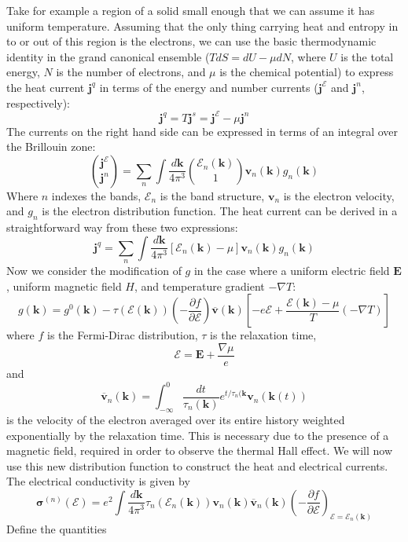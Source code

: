 \documentclass{thesis-umich}
\begin{document}
Take for example a region of a solid small enough that we can assume it has
uniform temperature. Assuming that the only thing carrying heat and entropy in to
or out of this region is the electrons, we can use the basic thermodynamic
identity in the grand canonical ensemble ($T dS = dU - \mu dN$, where $U$ is the
total energy, $N$ is the number of electrons, and $\mu$ is the chemical
potential) to express the heat current $\mathbf{j}^q$ in terms of the energy and
number currents ($\mathbf{j}^\mathcal{E}$ and $\mathbf{j}^n$, respectively):
\[ \mathbf{j}^q = T \mathbf{j}^s = \mathbf{j}^\mathcal{E} - \mu \mathbf{j}^n\]
The currents on the right hand side can be expressed in terms of an integral
over the Brillouin zone:
\[ \binom{\mathbf{j}^\mathcal{E}}{\mathbf{j}^n} = \sum_n \int
	\frac{d\mathbf{k}}{4\pi^3}\binom{\mathcal{E}_n(\mathbf{k})}{1}
	\mathbf{v}_n(\mathbf{k})g_n(\mathbf{k}) \]
Where $n$ indexes the bands, $\mathcal{E}_n$ is the band structure,
$\mathbf{v}_n$ is the electron velocity, and $g_n$ is the electron distribution
function. The heat current can be derived in a straightforward way from these
two expressions:
\[ \mathbf{j}^q = \sum_n \int
	\frac{d\mathbf{k}}{4\pi^3}[\mathcal{E}_n(\mathbf{k})-\mu]
	\mathbf{v}_n(\mathbf{k})g_n(\mathbf{k}) \]
Now we consider the modification of $g$ in the case where a uniform electric
field $\mathbf{E}$, uniform magnetic field $H$, and temperature gradient $-\nabla
T$:
\[ g(\mathbf{k}) = g^0(\mathbf{k}) -
	\tau(\mathcal{E}(\mathbf{k}))\left(-\frac{\partial f}{\partial
		\mathcal{E}}\right)\overline{\mathbf{v}}(\mathbf{k})\left[-e\mathbf{\mathcal{E}}
		+ \frac{\mathcal{E}(\mathbf{k}) - \mu}{T}(-\nabla T)\right] \]
where $f$ is the Fermi-Dirac distribution, $\tau$ is the relaxation time,
\[\mathbf{\mathcal{E}} = \mathbf{E} + \frac{\nabla\mu}{e}\]
and 
\[\overline{\mathbf{v}}_n(\mathbf{k}) = \int_{-\infty}^0
\frac{dt}{\tau_n(\mathbf{k})}e^{t/\tau_n(\mathbf{k}}\mathbf{v}_n(\mathbf{k}(t))\]
is the velocity of the electron averaged over its entire history weighted
exponentially by the relaxation time. This is necessary due to the presence of a
magnetic field, required in order to observe the thermal Hall effect. We will
now use this new distribution function to construct the heat and electrical
currents. The electrical conductivity is given by
\[ \mathbf{\sigma}^{(n)}(\mathcal{E}) = e^2 \int \frac{d\mathbf{k}}{4\pi^3}
\tau_n(\mathcal{E}_n(\mathbf{k}))
\mathbf{v}_n(\mathbf{k})\overline{\mathbf{v}}_n(\mathbf{k})\left(-\frac{\partial
f}{\partial \mathcal{E}}\right)_{\mathcal{E}=\mathcal{E}_n(\mathbf{k})}\]
Define the quantities
\end{document}
